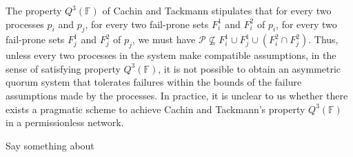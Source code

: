 \documentclass[11pt,letterpaper]{article}
\newcommand{\note}[1]{{\color{red}#1}}
\begin{document}

The property $Q^3(\mathbb{F})$ of Cachin and Tackmann stipulates that for every two processes $p_i$ and $p_j$, for every two fail-prone sets $F_i^1$ and $F_i^2$ of $p_i$, for every two fail-prone sets $F_j^1$ and $F_j^2$ of $p_j$, we must have $\mathcal{P}\not\subseteq F_i^1\cup F_j^1\cup \left(F_i^2\cap F_j^2\right)$. Thus, unless every two processes in the system make compatible assumptions, in the sense of satisfying property $Q^3(\mathbb{F})$, it is not possible to obtain an asymmetric quorum system that tolerates failures within the bounds of the failure assumptions made by the processes. In practice, it is unclear to us whether there exists a pragmatic scheme to achieve Cachin and Tackmann's property $Q^3(\mathbb{F})$ in a permissionless network.

\note{Say something about~\cite{alposHowTrustStrangers2021}}

\printbibliography






\appendix
\end{document}
